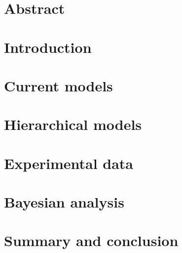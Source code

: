 \begin{refsection}

\section*{Abstract}


\section{Introduction}


\section{Current models} \label{sec:ICASP:Previous}


\section{Hierarchical models} \label{sec:ICASP:Networks}


\section{Experimental data} \label{sec:ICASP:Data}


\section{Bayesian analysis} \label{sec:ICASP:Analysis}


\section{Summary and conclusion} \label{sec:ICASP:Conclusion}


\printbibliography[heading=subbibliography]
\end{refsection}